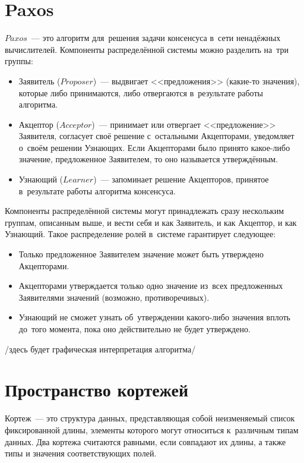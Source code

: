 \section{Paxos}\label{sec:3}
$Paxos$~--- это алгоритм для~решения задачи консенсуса в~сети ненадёжных вычислителей. Компоненты распределённой системы можно разделить на~три группы:
\begin{itemize}
	\item Заявитель ($Proposer$)~--- выдвигает <<предложения>> (какие-то значения), которые либо принимаются, либо отвергаются в~результате работы алгоритма.
	\item Акцептор ($Acceptor$)~--- принимает или отвергает <<предложение>> Заявителя, согласует своё решение с~остальными Акцепторами, уведомляет о~своём решении Узнающих. Если Акцепторами было принято какое-либо значение, предложенное Заявителем, то оно называется утверждённым.
	\item Узнающий ($Learner$)~--- запоминает решение Акцепторов, принятое в~результате работы алгоритма консенсуса.
\end{itemize}

Компоненты распределённой системы могут принадлежать сразу нескольким группам, описанным выше, и вести себя и как Заявитель, и как Акцептор, и как Узнающий. Такое распределение ролей в~системе гарантирует следующее:
\begin{itemize}
	\item Только предложенное Заявителем значение может быть утверждено Акцепторами.
	\item Акцепторами утверждается только одно значение из~всех предложенных Заявителями значений (возможно, противоречивых).
	\item Узнающий не сможет узнать об~утверждении какого-либо значения вплоть до~того момента, пока оно действительно не будет утверждено.
\end{itemize}

/здесь будет графическая интерпретация алгоритма/


\section{Пространство кортежей}\label{sec:4}
Кортеж~--- это структура данных, представляющая собой неизменяемый список фиксированной длины, элементы которого могут относиться к~различным типам данных. Два кортежа считаются равными, если совпадают их длины, а также типы и значения соответствующих полей.

